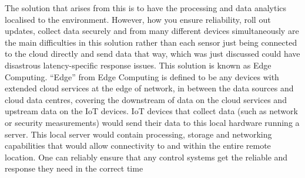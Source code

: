 The solution that arises from this is to have the processing and data analytics localised to the environment. However, how you ensure reliability, roll out updates, collect data securely and from many different devices simultaneously are the main difficulties in this solution rather than each sensor just being connected to the cloud directly and send data that way, which was just discussed could have disastrous latency-specific response issues. This solution is known as Edge Computing. “Edge” from Edge Computing is defined to be any devices with extended cloud services at the edge of network, in between the data sources and cloud data centres, covering the downstream of data on the cloud services and upstream data on the IoT devices. IoT devices that collect data (such as network or security measurements) would send their data to this local hardware running a server. This local server would contain processing, storage and networking capabilities that would allow connectivity to and within the entire remote location. One can reliably ensure that any control systems get the reliable and response they need in the correct time

